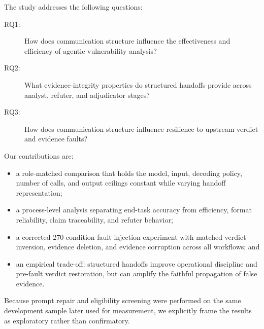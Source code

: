 The study addresses the following questions:

\begin{description}
  \item[RQ1:] How does communication structure influence the effectiveness and efficiency of agentic vulnerability analysis?
  \item[RQ2:] What evidence-integrity properties do structured handoffs provide across analyst, refuter, and adjudicator stages?
  \item[RQ3:] How does communication structure influence resilience to upstream verdict and evidence faults?
\end{description}

Our contributions are:
\begin{itemize}
  \item a role-matched comparison that holds the model, input, decoding policy, number of calls, and output ceilings constant while varying handoff representation;
  \item a process-level analysis separating end-task accuracy from efficiency, format reliability, claim traceability, and refuter behavior;
  \item a corrected 270-condition fault-injection experiment with matched verdict inversion, evidence deletion, and evidence corruption across all workflows; and
  \item an empirical trade-off: structured handoffs improve operational discipline and pre-fault verdict restoration, but can amplify the faithful propagation of false evidence.
\end{itemize}

Because prompt repair and eligibility screening were performed on the same development sample later used for measurement, we explicitly frame the results as exploratory rather than confirmatory.
